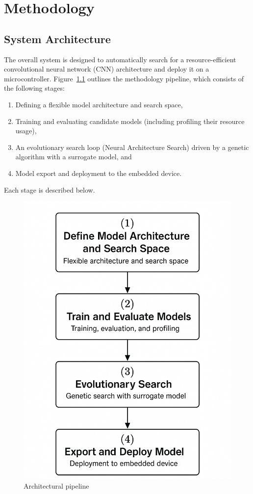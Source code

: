 \chapter{Methodology}

\section{System Architecture}

The overall system is designed to automatically search for a resource-efficient convolutional neural network (CNN) architecture and deploy it on a microcontroller. Figure~\ref{fig:architectural_pipeline} outlines the methodology pipeline, which consists of the following stages: 

\begin{enumerate}
    \item Defining a flexible model architecture and search space,
    \item Training and evaluating candidate models (including profiling their resource usage),
    \item An evolutionary search loop (Neural Architecture Search) driven by a genetic algorithm with a surrogate model, and
    \item Model export and deployment to the embedded device.
\end{enumerate}

Each stage is described below.

\begin{figure}[ht]
    \centering
    \includegraphics[width=0.6\linewidth]{Pictures/Architegture.png}
    \caption{Architectural pipeline}
    \label{fig:architectural_pipeline}
\end{figure}

